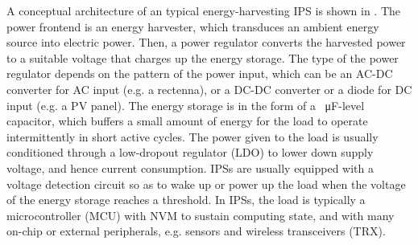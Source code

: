 
A conceptual architecture of an typical energy-harvesting IPS is shown in .
The power frontend is an energy harvester, which transduces an ambient energy source into electric power. 
Then, a power regulator converts the harvested power to a suitable voltage that charges up the energy storage.
The type of the power regulator depends on the pattern of the power input, which can be an AC-DC converter for AC input (e.g. a rectenna), or a DC-DC converter or a diode for DC input (e.g. a PV panel). 
The energy storage is in the form of a \SI{}{\micro\farad}-level capacitor, which buffers a small amount of energy for the load to operate intermittently in short active cycles.
The power given to the load is usually conditioned through a low-dropout regulator (LDO) to lower down supply voltage, and hence current consumption. 
IPSs are usually equipped with a voltage detection circuit so as to wake up or power up the load when the voltage of the energy storage reaches a threshold. 
In IPSs, the load is typically a microcontroller (MCU) with NVM to sustain computing state, and with many on-chip or external peripherals, e.g. sensors and wireless transceivers (TRX). 








